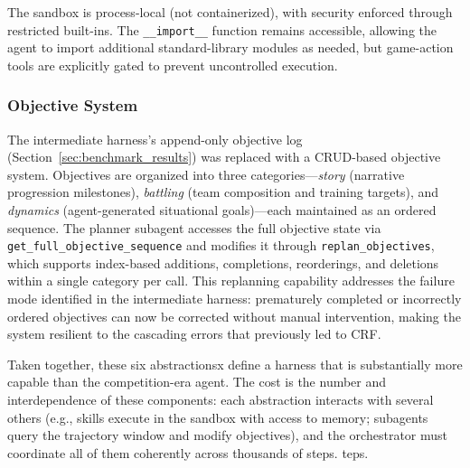 The sandbox is process-local (not containerized), with security enforced through restricted built-ins. The \texttt{\_\_import\_\_} function remains accessible, allowing the agent to import additional standard-library modules as needed, but game-action tools are explicitly gated to prevent uncontrolled execution.

\subsubsection{Objective System}\label{sec:objective_system}

The intermediate harness's append-only objective log (Section~\ref{sec:benchmark_results}) was replaced with a CRUD-based objective system. Objectives are organized into three categories---\emph{story} (narrative progression milestones), \emph{battling} (team composition and training targets), and \emph{dynamics} (agent-generated situational goals)---each maintained as an ordered sequence. The planner subagent accesses the full objective state via \texttt{get\_full\_objective\_sequence} and modifies it through \texttt{replan\_objectives}, which supports index-based additions, completions, reorderings, and deletions within a single category per call. This replanning capability addresses the failure mode identified in the intermediate harness: prematurely completed or incorrectly ordered objectives can now be corrected without manual intervention, making the system resilient to the cascading errors that previously led to CRF.

\vspace{1em}
Taken together, these six abstractionsx define a harness that is substantially more capable than the competition-era agent. The cost is the number and interdependence of these components: each abstraction interacts with several others (e.g., skills execute in the sandbox with access to memory; subagents query the trajectory window and modify objectives), and the orchestrator must coordinate all of them coherently across thousands of steps. 
teps. 
